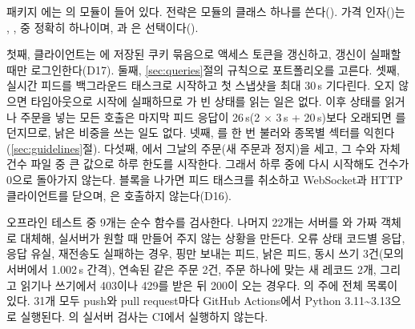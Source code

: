 \seclabel
{}

 패키지 에는 의 모듈이 들어 있다. 전략은  모듈의 클래스  하나를 쓴다(). 가격 인자()는 , ,  중 정확히 하나이며, 과 은 선택이다().



 첫째, 클라이언트는 에 저장된 쿠키 묶음으로 액세스 토큰을 갱신하고, 갱신이 실패할 때만 로그인한다(D17). 둘째, \ref{sec:queries}절의 규칙으로 포트폴리오를 고른다. 셋째, 실시간 피드를 백그라운드 태스크로 시작하고 첫 스냅샷을 최대 30\,s 기다린다. 오지 않으면 타임아웃으로 시작에 실패하므로 가 빈 상태를 읽는 일은 없다. 이후 상태를 읽거나 주문을 넣는 모든 호출은 마지막 피드 응답이 26\,s(2 $\times$ 3\,s + 20\,s)보다 오래되면 를 던지므로, 낡은 비중을 쓰는 일도 없다. 넷째, 를 한 번 불러와 종목별 섹터를 익힌다(\ref{sec:guidelines}절). 다섯째, 에서 그날의 주문(새 주문과 정지)을 세고, 그 수와 자체 건수 파일 중 큰 값으로 하루 한도를 시작한다. 그래서 하루 중에 다시 시작해도 건수가 0으로 돌아가지 않는다. 블록을 나가면 피드 태스크를 취소하고 WebSocket과 HTTP 클라이언트를 닫으며, 은 호출하지 않는다(D16).

 오프라인 테스트 중 9개는 순수 함수를 검사한다. 나머지 22개는 서버를 와 가짜 객체로 대체해, 실서버가 원할 때 만들어 주지 않는 상황을 만든다. 오류 상태 코드별 응답,  응답 유실, 재전송도 실패하는 경우, 핑만 보내는 피드, 낡은 피드, 동시 쓰기 3건(모의 서버에서 1.002\,s 간격), 연속된 같은 주문 2건, 주문 하나에 맞는 새 레코드 2개, 그리고 읽기나 쓰기에서 403이나 429를 받은 뒤 200이 오는 경우다. 의 주에 전체 목록이 있다. 31개 모두 push와 pull request마다 GitHub Actions에서 Python 3.11\textasciitilde 3.13으로 실행된다. 의 실서버 검사는 CI에서 실행하지 않는다.

